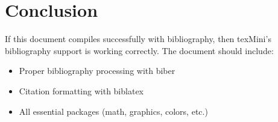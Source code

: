 \documentclass[11pt]{article}
\begin{document}
\section{Conclusion}

If this document compiles successfully with bibliography, then texMini's bibliography support is working correctly. The document should include:

\begin{itemize}
    \item Proper bibliography processing with biber
    \item Citation formatting with biblatex
    \item All essential packages (math, graphics, colors, etc.)
\end{itemize}

\printbibliography
\end{document}
